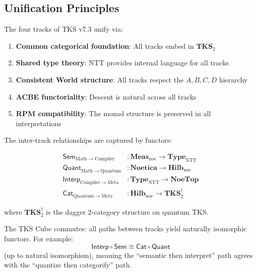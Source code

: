 \subsection{Unification Principles}
\label{subsec:unification-principles}

\begin{theorem}
\label{thm:tks-unification}
The four tracks of TKS v7.3 unify via:
\begin{enumerate}
  \item \textbf{Common categorical foundation}: All tracks embed in $\mathbf{TKS}_2$
  \item \textbf{Shared type theory}: NTT provides internal language for all tracks
  \item \textbf{Consistent World structure}: All tracks respect the $A, B, C, D$ hierarchy
  \item \textbf{ACBE functoriality}: Descent is natural across all tracks
  \item \textbf{RPM compatibility}: The monad structure is preserved in all interpretations
\end{enumerate}
\end{theorem}

\begin{definition}
\label{def:track-functors}
The inter-track relationships are captured by functors:

\begin{align*}
  \mathsf{Sem}_{\mathrm{Math} \to \mathrm{Compiler}} &: \mathbf{Meas}_{\mathrm{noe}} \to \mathbf{Type}_{\mathrm{NTT}} \\
  \mathsf{Quant}_{\mathrm{Math} \to \mathrm{Quantum}} &: \mathbf{Noetica} \to \mathbf{Hilb}_{\mathrm{noe}} \\
  \mathsf{Interp}_{\mathrm{Compiler} \to \mathrm{Meta}} &: \mathbf{Type}_{\mathrm{NTT}} \to \mathbf{NoeTop} \\
  \mathsf{Cat}_{\mathrm{Quantum} \to \mathrm{Meta}} &: \mathbf{Hilb}_{\mathrm{noe}} \to \mathbf{TKS}_2^{\dagger}
\end{align*}

where $\mathbf{TKS}_2^{\dagger}$ is the dagger 2-category structure on quantum TKS.
\end{definition}

\begin{proposition}
\label{prop:cube-commutes}
The TKS Cube commutes: all paths between tracks yield naturally isomorphic functors.
For example:
\[
  \mathsf{Interp} \circ \mathsf{Sem} \cong \mathsf{Cat} \circ \mathsf{Quant}
\]
(up to natural isomorphism), meaning the ``semantic then interpret'' path
agrees with the ``quantize then categorify'' path.
\end{proposition}

